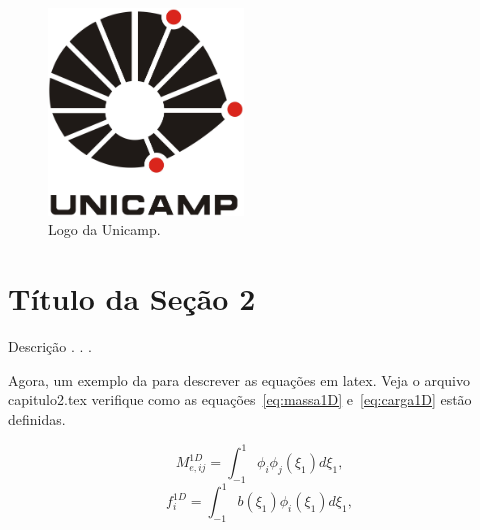 \begin{figure}[!thp]
  \centering
  \includegraphics[width=4.cm, height=5.5cm]{./cap2/figs/logo-unicamp.jpg}
  \caption{Logo da Unicamp.}
  \label{fig:logo}
\end{figure}

\section{Título da Seção 2}\label{cap2:secao2}

Descrição . . .

Agora, um exemplo da para descrever as equações em latex. Veja o arquivo capitulo2.tex verifique 
como as equações~\ref{eq:massa1D} e~\ref{eq:carga1D} estão definidas.

\begin{equation}\label{eq:massa1D}
M^{1D}_{e,ij} = \int_{-1}^{1}\phi_{i}\phi_{j}(\xi_{1}) d\xi_{1},
\end{equation}
\begin{equation}\label{eq:carga1D}
f^{1D}_{i} = \int_{-1}^{1} b(\xi_{1})\phi_{i}(\xi_{1}) d\xi_{1},
\end{equation}



